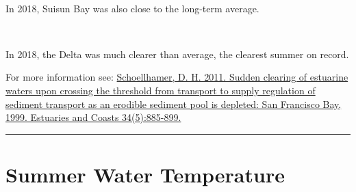 \documentclass[
]{book}
\begin{document}
\begin{panel-grid}
\begin{columns-nocenter}
\begin{column40}
~

\end{column40}

\begin{column800}

In 2018, Suisun Bay was also close to the long-term average.

\end{column800}

\begin{column40}

~

\end{column40}

\begin{column800}

In 2018, the Delta was much clearer than average, the clearest summer on record.

\end{column800}

\end{columns-nocenter}

\end{panel-grid}

\begin{disclaimer}
For more information see:
\href{https://link.springer.com/article/10.1007/s12237-011-9382-x}{Schoellhamer,
D. H. 2011. Sudden clearing of estuarine waters upon crossing the
threshold from transport to supply regulation of sediment transport as
an erodible sediment pool is depleted: San Francisco Bay, 1999.
Estuaries and Coasts 34(5):885-899.}
\end{disclaimer}

\begin{center}\rule{0.5\linewidth}{0.5pt}\end{center}

\hypertarget{summer-water-temperature}{%
\section{Summer Water Temperature}\label{summer-water-temperature}}
\end{document}
